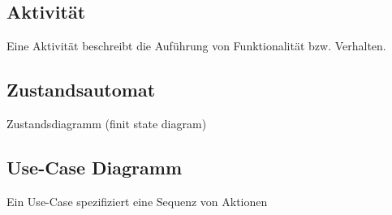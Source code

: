 \subsection{Aktivität }
  Eine Aktivität beschreibt die Auführung von Funktionalität bzw. Verhalten.

\subsection{Zustandsautomat }
  Zustandsdiagramm (finit state diagram)
 

\newpage

\subsection{Use-Case Diagramm }
	Ein Use-Case spezifiziert eine Sequenz von Aktionen
